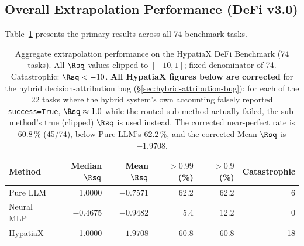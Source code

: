 \subsection{Overall Extrapolation Performance (DeFi v3.0)}\label{subsec:overall-extrapolation-performance-defi-v}
\label{sec:results_defi}

Table~\ref{tab:main_results} presents the primary results across all 74 benchmark tasks.

\begin{table}[h]
\centering
\caption{Aggregate extrapolation performance on the HypatiaX DeFi Benchmark (74 tasks).
All $\Rsq$ values clipped to $[-10,1]$; fixed denominator of 74.
Catastrophic: $\Rsq < -10$. \textbf{All HypatiaX figures below are corrected}
for the hybrid decision-attribution bug (\S\ref{sec:hybrid-attribution-bug}):
for each of the 22 tasks where the hybrid system's own
accounting falsely reported \texttt{success=True}, $\Rsq \approx 1.0$ while the
routed sub-method actually failed, the sub-method's true (clipped) $\Rsq$ is
used instead. The corrected near-perfect rate is $60.8\,\%$
(45/74), below Pure LLM's $62.2\,\%$,
and the corrected Mean $\Rsq$ is $-1.9708$.}
\label{tab:main_results}
\begin{tabular}{lrrrrr}
\toprule
Method & Median $\Rsq$ & Mean $\Rsq$ & $>0.99$ (\%) & $>0.9$ (\%) & Catastrophic \\
\midrule
Pure LLM      & 1.0000 & $-0.7571$ & 62.2 & 62.2 & 6 \\
Neural MLP    & $-0.4675$ & $-0.9482$ & 5.4  & 12.2 & 0 \\
HypatiaX      & 1.0000 & $-1.9708$ & 60.8 & 60.8 & 18 \\
\bottomrule
\end{tabular}
\end{table}
